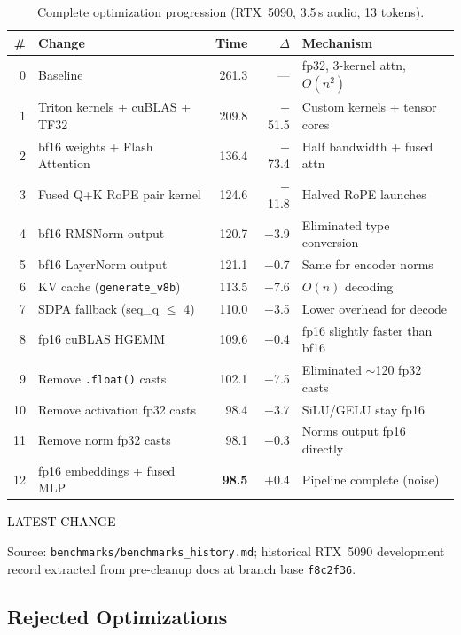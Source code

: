 \documentclass{article}
\newcommand{\latestchglabel}{{\setlength{\fboxsep}{1pt}\colorbox{yellow!65}{\textcolor{black}{\scriptsize LATEST CHANGE}}}}
\newcommand{\latestsource}[1]{%
  \par\noindent
  {\footnotesize \latestchglabel\ \parbox[t]{0.9\linewidth}{#1}}\par
}
\begin{document}
\begin{table}[h]
\centering
\caption{Complete optimization progression (RTX~5090, 3.5\,s audio, 13 tokens).}
\label{tab:progression}
\small
\begin{tabular}{@{}rlrrl@{}}
\toprule
\textbf{\#} & \textbf{Change} & \textbf{Time} & \textbf{$\Delta$} & \textbf{Mechanism} \\
\midrule
0 & Baseline & 261.3 & --- & fp32, 3-kernel attn, $O(n^2)$ \\
1 & Triton kernels + cuBLAS + TF32 & 209.8 & $-$51.5 & Custom kernels + tensor cores \\
2 & bf16 weights + Flash Attention & 136.4 & $-$73.4 & Half bandwidth + fused attn \\
3 & Fused Q+K RoPE pair kernel & 124.6 & $-$11.8 & Halved RoPE launches \\
4 & bf16 RMSNorm output & 120.7 & $-$3.9 & Eliminated type conversion \\
5 & bf16 LayerNorm output & 121.1 & $-$0.7 & Same for encoder norms \\
6 & KV cache (\texttt{generate\_v8b}) & 113.5 & $-$7.6 & $O(n) $ decoding \\
7 & SDPA fallback (seq\_q $\leq$ 4) & 110.0 & $-$3.5 & Lower overhead for decode \\
8 & fp16 cuBLAS HGEMM & 109.6 & $-$0.4 & fp16 slightly faster than bf16 \\
9 & Remove \texttt{.float()} casts & 102.1 & $-$7.5 & Eliminated $\sim$120 fp32 casts \\
10 & Remove activation fp32 casts & 98.4 & $-$3.7 & SiLU/GELU stay fp16 \\
11 & Remove norm fp32 casts & 98.1 & $-$0.3 & Norms output fp16 directly \\
12 & fp16 embeddings + fused MLP & \textbf{98.5} & $+$0.4 & Pipeline complete (noise) \\
\bottomrule
\end{tabular}
\end{table}

\latestsource{Source: \texttt{benchmarks/benchmarks\_history.md}; historical RTX~5090 development record extracted from pre-cleanup docs at branch base \texttt{f8c2f36}.}

\subsection{Rejected Optimizations}
\end{document}
